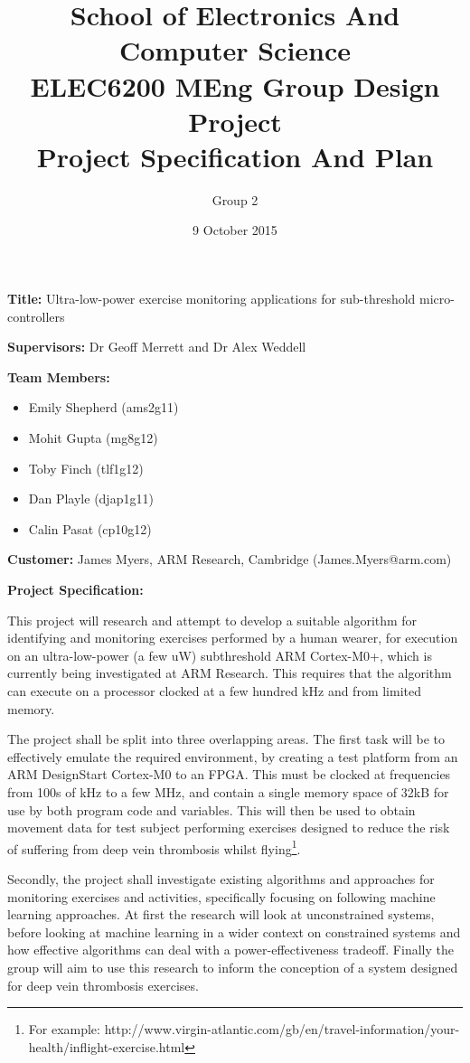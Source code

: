 \documentclass{article}
\title{School of Electronics And Computer Science \\
ELEC6200 MEng Group Design Project \\
Project Specification And Plan}
\author{Group 2}
\date{9 October 2015}
\begin{document}
\maketitle

\textbf{Title:} Ultra-low-power exercise monitoring applications for sub-threshold micro-controllers

\textbf{Supervisors:} Dr Geoff Merrett and Dr Alex Weddell

\textbf{Team Members:}
\begin{itemize}
	\item Emily Shepherd (ams2g11)
	\item Mohit Gupta (mg8g12)
	\item Toby Finch (tlf1g12)
	\item Dan Playle (djap1g11)
	\item Calin Pasat (cp10g12)
\end{itemize}

\textbf{Customer:} James Myers, ARM Research, Cambridge (James.Myers@arm.com)

\textbf{Project Specification:}

This project will research and attempt to develop a suitable algorithm for identifying and
monitoring exercises performed by a human wearer, for execution on an ultra-low-power
(a few uW) subthreshold ARM Cortex-M0+, which is currently being investigated at ARM Research.
This requires that the algorithm can execute on a processor clocked at a few hundred
kHz and from limited memory.

The project shall be split into three overlapping areas. The first task will be to effectively
emulate the required environment, by creating a test platform from an ARM DesignStart Cortex-M0
to an FPGA. This must be clocked at frequencies from 100s of kHz to a few MHz, and contain a
single memory space of 32kB for use by both program code and variables. This will then be used to
obtain movement data for test subject performing exercises designed to reduce the risk of suffering from
deep vein thrombosis whilst flying\footnote{For example:
http://www.virgin-atlantic.com/gb/en/travel-information/your-health/inflight-exercise.html}.

Secondly, the project shall investigate existing algorithms and approaches for monitoring
exercises and activities, specifically focusing on following machine learning
approaches. At first the research will look at unconstrained systems, before looking at
machine learning in a wider context on constrained systems and how effective algorithms can
deal with a power-effectiveness tradeoff. Finally the group will aim to use this research
to inform the conception of a system designed for deep vein thrombosis exercises.
\end{document}
